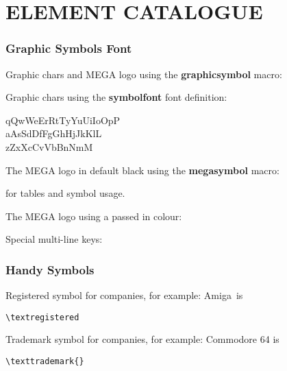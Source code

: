 %
%
%


\part{ELEMENT CATALOGUE}

\section{Graphic Symbols Font}

Graphic chars and MEGA logo using the {\bf graphicsymbol} macro:


Graphic chars using the {\bf symbolfont} font definition:

\begin{symbolfont}%
	qQwWeErRtTyYuUiIoOpP\\
	aAsSdDfFgGhHjJkKlL\\
	zZxXcCvVbBnNmM%
\end{symbolfont}%

The MEGA logo in default black using the {\bf megasymbol} macro:

\megasymbol for tables and symbol usage.

The MEGA logo using a passed in colour:

\megasymbol[black]
\megasymbol[brown]
\megasymbol[orange]
\megasymbol[blue]

Special multi-line keys:
%
%
%
%
%
%
%

\section{Handy Symbols}
Registered symbol for companies, for example: Amiga\textregistered \ is \begin{verbatim}
\textregistered
\end{verbatim}

Trademark symbol for companies, for example: Commodore 64\texttrademark{} is \begin{verbatim}
\texttrademark{}
\end{verbatim}

